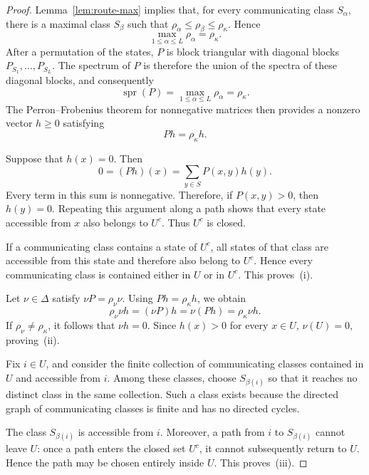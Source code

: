 \documentclass[10pt,letterpaper]{article}
\theoremstyle{compactplain}
\theoremstyle{compactdefinition}
\newcommand{\1}{\mathds{1}}
\begin{document}
\begin{proof}
Lemma~\ref{lem:route-max} implies that, for every communicating class
\(S_\alpha\), there is a maximal class \(S_\beta\) such that \(\rho_\alpha\leq\rho_\beta\leq\rho_\kappa.\)
Hence
\[
\max_{1\leq\alpha\leq L}\rho_\alpha=\rho_\kappa.
\]
After a permutation of the states, \(P\) is block triangular with diagonal
blocks \(P_{S_1},\ldots,P_{S_L}\). The spectrum of \(P\) is therefore the
union of the spectra of these diagonal blocks, and consequently
\[
\operatorname{spr}(P)
=
\max_{1\leq\alpha\leq L}\rho_\alpha
=
\rho_\kappa.
\]
The Perron--Frobenius theorem for nonnegative matrices then provides a
nonzero vector \(h\geq0\) satisfying
\[
Ph=\rho_\kappa h.
\]

Suppose that \(h(x)=0\). Then
\[
0=(Ph)(x)=\sum_{y\in S}P(x,y)h(y).
\]
Every term in this sum is nonnegative. Therefore, if \(P(x,y)>0\), then
\(h(y)=0\). Repeating this argument along a path shows that every state
accessible from \(x\) also belongs to \(U^c\). Thus \(U^c\) is closed.

If a communicating class contains a state of \(U^c\), all states of that
class are accessible from this state and therefore also belong to \(U^c\).
Hence every communicating class is contained either in \(U\) or in \(U^c\).
This proves~\textup{(i)}.

Let \(\nu\in\Delta\) satisfy \(\nu P=\rho_\nu\nu\). Using
\(Ph=\rho_\kappa h\), we obtain
\[
\rho_\nu\nu h
=
(\nu P)h
=
\nu(Ph)
=
\rho_\kappa\nu h.
\]
If \(\rho_\nu\neq\rho_\kappa\), it follows that \(\nu h=0\). Since
\(h(x)>0\) for every \(x\in U\), 
\(\nu(U)=0\), proving~\textup{(ii)}.

Fix \(i\in U\), and consider the finite collection of communicating classes
contained in \(U\) and accessible from \(i\). Among these classes, choose
\(S_{\beta(i)}\) so that it reaches no distinct class in the same collection.
Such a class exists because the directed graph of communicating classes is
finite and has no directed cycles.

The class \(S_{\beta(i)}\) is accessible from \(i\). Moreover, a path from
\(i\) to \(S_{\beta(i)}\) cannot leave \(U\): once a path enters the closed
set \(U^c\), it cannot subsequently return to \(U\). Hence the path may be
chosen entirely inside \(U\). 
This proves~\textup{(iii)}.


\end{proof}
\end{document}
